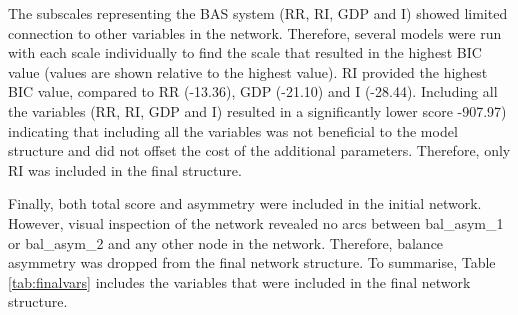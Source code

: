 \documentclass[
  english,
  man,floatsintext]{apa6}
\begin{document}
The subscales representing the BAS system (RR, RI, GDP and I) showed limited connection to other variables in the network.
Therefore, several models were run with each scale individually to find the scale that resulted in the highest BIC value (values are shown relative to the highest value).
RI provided the highest BIC value, compared to RR (-13.36), GDP (-21.10) and I (-28.44).
Including all the variables (RR, RI, GDP and I) resulted in a significantly lower score -907.97) indicating that including all the variables was not beneficial to the model structure and did not offset the cost of the additional parameters. Therefore, only RI was included in the final structure.

Finally, both total score and asymmetry were included in the initial network. However, visual inspection of the network revealed no arcs between bal\_asym\_1 or bal\_asym\_2 and any other node in the network.
Therefore, balance asymmetry was dropped from the final network structure.
To summarise, Table \ref{tab:finalvars} includes the variables that were included in the final network structure.
\end{document}
